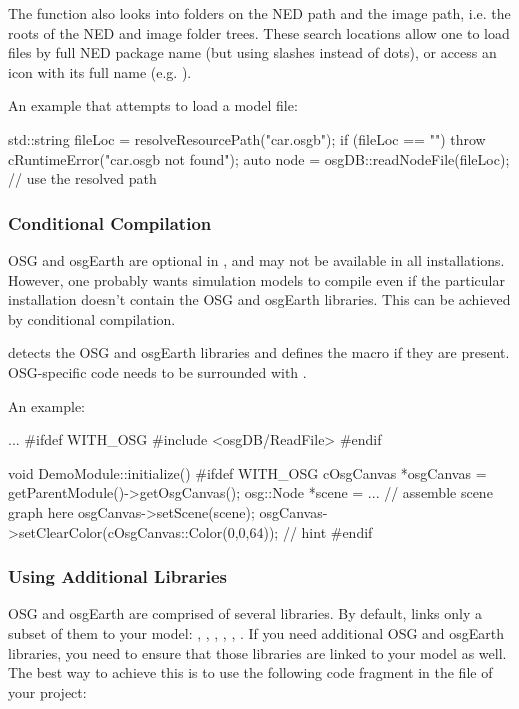 The function also looks into folders on the NED path and the image
path, i.e. the roots of the NED and image folder trees. These search
locations allow one to load files by full NED package name (but using
slashes instead of dots), or access an icon with its full name (e.g.
).

An example that attempts to load a  model file:

\begin{cpp}
std::string fileLoc = resolveResourcePath("car.osgb");
if (fileLoc == "")
    throw cRuntimeError("car.osgb not found");
auto node = osgDB::readNodeFile(fileLoc); // use the resolved path
\end{cpp}


\subsubsection{Conditional Compilation}

OSG and osgEarth are optional in {\opp}, and may not be available in all
installations. However, one probably wants simulation models to compile
even if the particular {\opp} installation doesn't contain the OSG and
osgEarth libraries. This can be achieved by conditional compilation.

{\opp} detects the OSG and osgEarth libraries and defines the  macro
if they are present. OSG-specific code needs to be surrounded with .

An example:

\begin{cpp}
...
#ifdef WITH_OSG
#include <osgDB/ReadFile>
#endif

void DemoModule::initialize()
{
#ifdef WITH_OSG
    cOsgCanvas *osgCanvas = getParentModule()->getOsgCanvas();
    osg::Node *scene = ... // assemble scene graph here
    osgCanvas->setScene(scene);
    osgCanvas->setClearColor(cOsgCanvas::Color(0,0,64)); // hint
#endif
}
\end{cpp}

\subsubsection{Using Additional Libraries}

OSG and osgEarth are comprised of several libraries. By default, {\opp}
links only a subset of them to your model: , ,
, , , . If you
need additional OSG and osgEarth libraries, you need to ensure that those
libraries are linked to your model as well. The best way to achieve this is
to use the following code fragment in the  file of your
project:

